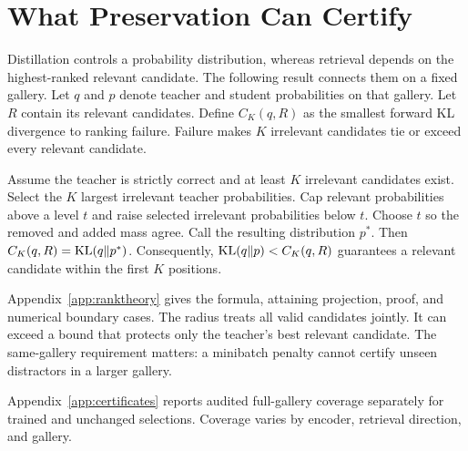 \section{What Preservation Can Certify}
\label{sec:ranktheory}
Distillation controls a probability distribution, whereas retrieval depends on the highest-ranked relevant candidate.
The following result connects them on a fixed gallery.
Let $q$ and $p$ denote teacher and student probabilities on that gallery.
Let $R$ contain its relevant candidates.
Define $C_K(q,R)$ as the smallest forward KL divergence to ranking failure.
Failure makes $K$ irrelevant candidates tie or exceed every relevant candidate.

\begin{proposition}
Assume the teacher is strictly correct and at least $K$ irrelevant candidates exist.
Select the $K$ largest irrelevant teacher probabilities.
Cap relevant probabilities above a level $t$ and raise selected irrelevant probabilities below $t$.
Choose $t$ so the removed and added mass agree.
Call the resulting distribution $p^*$.
Then $C_K(q,R)=\operatorname{KL}(q\|p^*)$.
Consequently, $\operatorname{KL}(q\|p)<C_K(q,R)$ guarantees a relevant candidate within the first $K$ positions.
\end{proposition}

Appendix~\ref{app:ranktheory} gives the formula, attaining projection, proof, and numerical boundary cases.
The radius treats all valid candidates jointly.
It can exceed a bound that protects only the teacher's best relevant candidate.
The same-gallery requirement matters: a minibatch penalty cannot certify unseen distractors in a larger gallery.

Appendix~\ref{app:certificates} reports audited full-gallery coverage separately for trained and unchanged selections.
Coverage varies by encoder, retrieval direction, and gallery.
